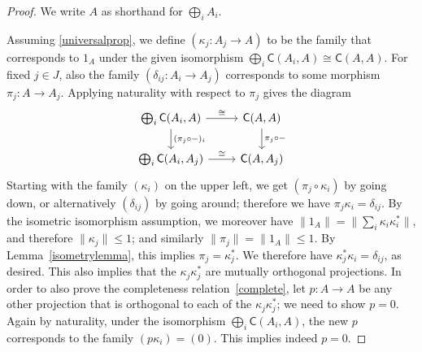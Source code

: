 \documentclass[reqno,T1]{amsproc}
\newcommand{\cat}[1]{\mathsf{#1}}		%
\newcommand{\id}[1]{1_{#1}}			%
\theoremstyle{plain}
\theoremstyle{remark}
\numberwithin{equation}{section}
\begin{document}
\begin{proof}
We write $A$ as shorthand for $\bigoplus_i A_i$.

Assuming \ref{universalprop}, we define $(\kappa_j : A_j \to A)$ to be the family that corresponds to $\id{A}$ under the given isomorphism $\bigoplus_i \cat{C}(A_i,A) \cong \cat{C}(A,A)$. For fixed $j\in J$, also the family $(\delta_{ij} : A_i \to A_j)$ corresponds to some morphism $\pi_j : A \to A_j$. Applying naturality with respect to $\pi_j$ gives the diagram
\[\begin{tikzcd}
	\bigoplus_i \cat{C}(A_i,A) \ar{r}{\cong} \ar{d}{(\pi_j\circ -)_i} & \cat{C}(A,A) \ar{d}{\pi_j\circ -} \\
	\bigoplus_i \cat{C}(A_i,A_j) \ar{r}{\cong} & \cat{C}(A,A_j)
\end{tikzcd}\]
Starting with the family $(\kappa_i)$ on the upper left, we get $(\pi_j\circ\kappa_i)$ by going down, or alternatively $(\delta_{ij})$ by going around; therefore we have $\pi_j \kappa_i = \delta_{ij}$. By the isometric isomorphism assumption, we moreover have $\| \id{A} \| = \| \sum_i \kappa_i \kappa_i^* \|$, and therefore $\| \kappa_j \| \leq 1$; and similarly $\| \pi_j \| = \| \id{A} \| \leq 1$. By Lemma~\ref{isometrylemma}, this implies $\pi_j = \kappa_j^*$. We therefore have $\kappa_j^*\kappa_i = \delta_{ij}$, as desired. This also implies that the $\kappa_j \kappa_j^*$ are mutually orthogonal projections. In order to also prove the completeness relation~\eqref{complete}, let $p : A\to A$ be any other projection that is orthogonal to each of the $\kappa_j \kappa_j^*$; we need to show $p = 0$. Again by naturality, under the isomorphism $\bigoplus_i \cat{C}(A_i,A)$, the new $p$ corresponds to the family $(p\kappa_i) = (0)$. This implies indeed $p=0$.


\end{proof}
\end{document}
